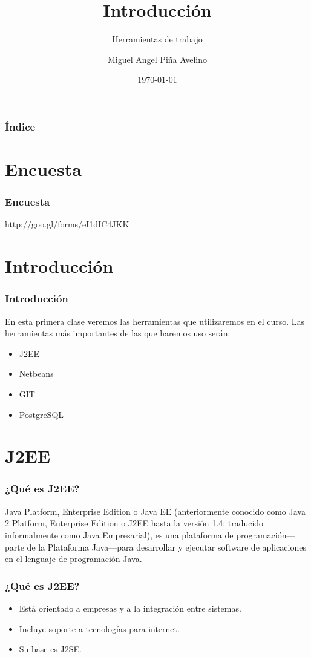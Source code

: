 \documentclass{beamer}
\title[Laboratorio]{Introducción}
\subtitle{Herramientas de trabajo}
\author[Miguel]{Miguel Angel Piña Avelino}
\institute[UNAM]{
  Facultad de Ciencias, UNAM
}
\date{\today}
\begin{document}
\frame{\titlepage}

\begin{frame}
  \frametitle{Índice}
  \tableofcontents
\end{frame}

\section{Encuesta}
\begin{frame}
  \frametitle{Encuesta}
  http://goo.gl/forms/eI1dIC4JKK
\end{frame}

\section{Introducción}
\begin{frame}
  \frametitle{Introducción}
  En esta primera clase veremos las herramientas que utilizaremos en el curso.
  Las herramientas más importantes de las que haremos uso serán:
  \begin{itemize}
    \item J2EE
    \item Netbeans
    \item GIT
    \item PostgreSQL
  \end{itemize}
\end{frame}
\section{J2EE}

\begin{frame}
  \frametitle{¿Qué es J2EE?}
  Java Platform, Enterprise Edition o Java EE (anteriormente conocido como Java
  2 Platform, Enterprise Edition o J2EE hasta la versión 1.4; traducido
  informalmente como Java Empresarial), es una plataforma de programación—parte
  de la Plataforma Java—para desarrollar y ejecutar software de aplicaciones en
  el lenguaje de programación Java.
\end{frame}

\begin{frame}
  \frametitle{¿Qué es J2EE?}
  \begin{itemize}
    \item Está orientado a empresas y a la integración entre sistemas.
    \item Incluye soporte a tecnologías para internet.
    \item Su base es J2SE.
  \end{itemize}
\end{frame}
\end{document}
